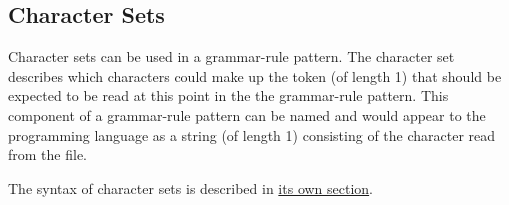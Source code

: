 
\subsection{Character Sets}
{
	Character sets can be used in a grammar-rule pattern.
	The character set describes which characters could make up the
	token (of length 1) that should be
	expected
	to be read at this point in the the grammar-rule pattern.
	This component of a grammar-rule pattern can be named and would appear to
	the programming language as a string (of length 1) consisting of
	the character read from the file.
	
	The syntax of character sets is described in
	\hyperref[subsec:charset]{its own section}.
}
